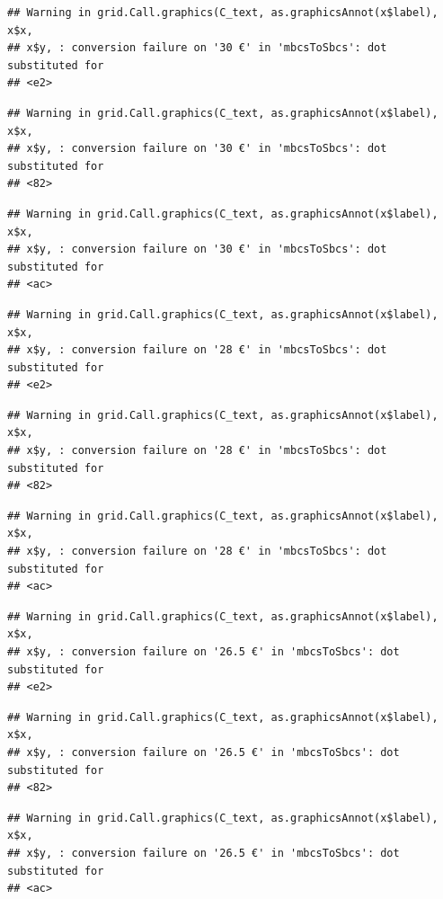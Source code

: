 \documentclass[]{gitbook}
\begin{document}
\begin{verbatim}
## Warning in grid.Call.graphics(C_text, as.graphicsAnnot(x$label), x$x,
## x$y, : conversion failure on '30 €' in 'mbcsToSbcs': dot substituted for
## <e2>
\end{verbatim}

\begin{verbatim}
## Warning in grid.Call.graphics(C_text, as.graphicsAnnot(x$label), x$x,
## x$y, : conversion failure on '30 €' in 'mbcsToSbcs': dot substituted for
## <82>
\end{verbatim}

\begin{verbatim}
## Warning in grid.Call.graphics(C_text, as.graphicsAnnot(x$label), x$x,
## x$y, : conversion failure on '30 €' in 'mbcsToSbcs': dot substituted for
## <ac>
\end{verbatim}

\begin{verbatim}
## Warning in grid.Call.graphics(C_text, as.graphicsAnnot(x$label), x$x,
## x$y, : conversion failure on '28 €' in 'mbcsToSbcs': dot substituted for
## <e2>
\end{verbatim}

\begin{verbatim}
## Warning in grid.Call.graphics(C_text, as.graphicsAnnot(x$label), x$x,
## x$y, : conversion failure on '28 €' in 'mbcsToSbcs': dot substituted for
## <82>
\end{verbatim}

\begin{verbatim}
## Warning in grid.Call.graphics(C_text, as.graphicsAnnot(x$label), x$x,
## x$y, : conversion failure on '28 €' in 'mbcsToSbcs': dot substituted for
## <ac>
\end{verbatim}

\begin{verbatim}
## Warning in grid.Call.graphics(C_text, as.graphicsAnnot(x$label), x$x,
## x$y, : conversion failure on '26.5 €' in 'mbcsToSbcs': dot substituted for
## <e2>
\end{verbatim}

\begin{verbatim}
## Warning in grid.Call.graphics(C_text, as.graphicsAnnot(x$label), x$x,
## x$y, : conversion failure on '26.5 €' in 'mbcsToSbcs': dot substituted for
## <82>
\end{verbatim}

\begin{verbatim}
## Warning in grid.Call.graphics(C_text, as.graphicsAnnot(x$label), x$x,
## x$y, : conversion failure on '26.5 €' in 'mbcsToSbcs': dot substituted for
## <ac>
\end{verbatim}
\end{document}

